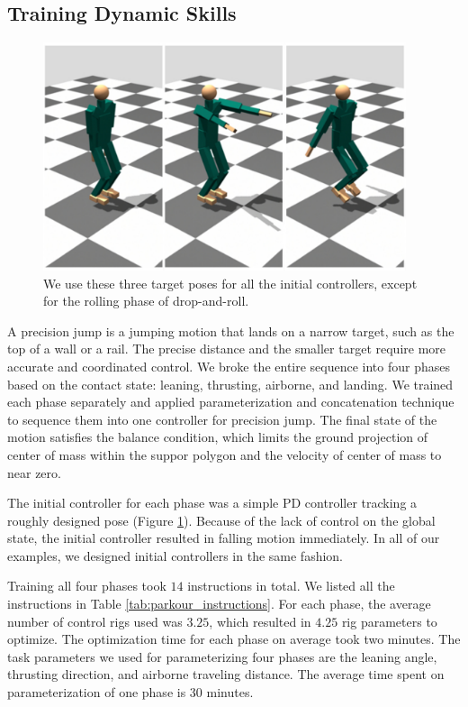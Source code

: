 \subsection{Training Dynamic Skills}

\begin{figure}[tb]
\center
  \includegraphics[width=4.2in]{images/keyframes}
  \caption{
    We use these three target poses for all the initial
    controllers, except for the rolling phase of drop-and-roll.
  }
  \label{fig:parkour_keyframes}
\end{figure}

A precision jump is a jumping motion that lands on a narrow target,
such as the top of a wall or a rail. The precise distance and the
smaller target require more accurate and coordinated control. We broke
the entire sequence into four phases based on the contact state:
leaning, thrusting, airborne, and landing. We trained each phase
separately and applied parameterization and concatenation technique
to sequence them into one controller for precision jump.
The final state of the motion satisfies the balance condition,
which limits the ground projection of center of mass within the suppor
polygon and the velocity of center of mass to near zero.


The initial controller for each phase was a simple PD controller
tracking a roughly designed pose (Figure \ref{fig:parkour_keyframes}). Because
of the lack of control on the global state, the initial controller
resulted in falling motion immediately. In all of our examples, we
designed initial controllers in the same fashion.

Training all four phases took $14$ instructions in total. We listed all
the instructions in Table \ref{tab:parkour_instructions}. For each phase, the average
number of control rigs used was $3.25$, which resulted in $4.25$ rig
parameters to optimize. The optimization time for each phase on
average took two minutes. The task parameters we used for parameterizing
four phases are the leaning angle, thrusting direction, and airborne
traveling distance. The average time spent on parameterization of one
phase is 30 minutes.


